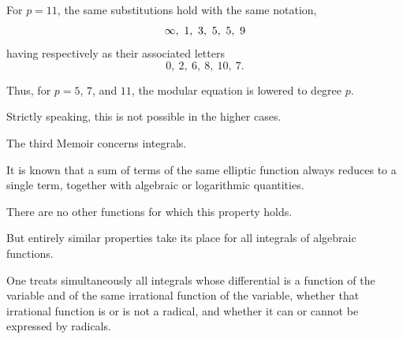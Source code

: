 For $p=11$, the same substitutions hold with the same notation,
\[
\infty,\ 1,\ 3,\ \GalPrintedError{5}{W08-PE001},\ 5,\ 9
\]
having respectively as their associated letters
\[
0,\ 2,\ 6,\ 8,\ 10,\ 7.
\]


Thus, for $p=5$, $7$, and $11$, the modular equation is lowered to
degree $p$.

Strictly speaking, this  is not
possible in the higher cases.


The third Memoir concerns integrals.

It is known that a sum of terms of the same elliptic function always
reduces to a single term, together with algebraic or logarithmic
quantities.

There are no other functions for which this property holds.

But entirely similar properties take its place for all integrals of
algebraic functions.


One treats simultaneously all integrals whose differential is a
function of the variable and of the same irrational function of the
variable, whether that irrational function is or is not a radical, and
whether it can or cannot be expressed by radicals.

